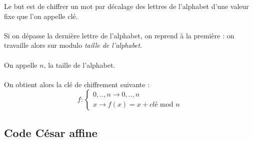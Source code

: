 \documentclass[12pt,french,titlepage]{article}
\begin{document}
	Le but est de chiffrer un mot par décalage des lettres de l'alphabet d'une valeur fixe que l'on appelle clé.\\
	\\
	Si on dépasse la dernière lettre de l'alphabet, on reprend à la première : on travaille alors sur modulo \textit{taille de l'alphabet}.\\
	\\
	On appelle $n$, la taille de l'alphabet.\\
	\\
	On obtient alors la clé de chiffrement suivante :\\
	
	$$
	f:\left\{
	\begin{array}{l}
	{0,..,n} \rightarrow {0,..,n}\\
	x \rightarrow f(x)=x + \textit{clé }\text{mod } n
	\end{array}
	
	\right.
		$$
	\subsection{Code César affine}
\end{document}
